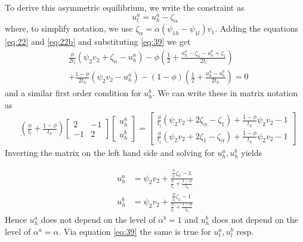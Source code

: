 \documentclass[12pt,english,a4paper]{article}
\begin{document}
To derive this asymmetric equilibrium, we write the constraint as
\begin{equation}
\label{eq:39}
u_l^a = u_h^a - \zeta_{\alpha}
\end{equation}
where, to simplify notation, we use \(\zeta_{\alpha}=\alpha (\psi_{1h}-\psi_{1l})v_1\).
Adding the equations \eqref{eq:22} and \eqref{eq:22b} and substituting \eqref{eq:39} we get
\begin{equation}
\label{eq:40}
\begin{split}
&\frac{\phi}{2t_l}(\psi_2 v_2 + \zeta_{\alpha} - u_h^a) - \phi(\frac{1}{2} + \frac{u_h^a - \zeta_{\alpha} - u_h^b + \zeta_1}{2t_l} ) \\
&+\frac{1-\phi}{2t_h} (\psi_2 v_2 - u_h^a) - (1-\phi) (\frac{1}{2} + \frac{u_h^a - u_h^b}{2t_h} )   =0
\end{split}
\end{equation}
and a similar first order condition for \(u_h^b\). We can write these in matrix notation as
\begin{equation}
\label{eq:41}
\begin{split}
& (\frac{\phi}{t_l} + \frac{1-\phi}{t_h})
\begin{bmatrix}
2 & -1 \\
-1&  2
\end{bmatrix}
\begin{bmatrix}
u_h^a \\
u_h^b
\end{bmatrix}
=
\begin{bmatrix}
\frac{\phi}{t_l}(\psi_2 v_2 + 2 \zeta_{\alpha} - \zeta_1) + \frac{1-\phi}{t_h}\psi_2 v_2 -1 \\
\frac{\phi}{t_l}(\psi_2 v_2 + 2 \zeta_{1} - \zeta_\alpha) + \frac{1-\phi}{t_h}\psi_2 v_2 -1
\end{bmatrix}
\end{split}
\end{equation}
Inverting the matrix on the left hand side and solving for \(u_h^a,u_h^b\) yields

\begin{align}
\label{eq:47}
u_h^a &= \psi_2 v_2 + \frac{\frac{\phi}{t_l} \zeta_{\alpha} -1}{\frac{\phi}{t_l}+\frac{1-\phi}{t_h}} \\
\label{eq:47b}
u_h^b &= \psi_2 v_2 + \frac{\frac{\phi}{t_l} \zeta_{1} -1}{\frac{\phi}{t_l}+\frac{1-\phi}{t_h}}
\end{align}
Hence \(u_h^a\) does not depend on the level of \(\alpha^b =1\) and \(u_h^b\) does not depend on the level of \(\alpha^a =\alpha\). Via equation \eqref{eq:39} the same is true for \(u_l^a,u_l^b\) resp.
\end{document}
